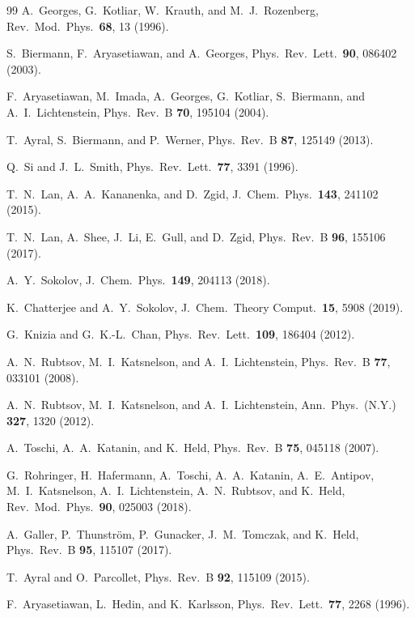 \documentclass[11pt,a4paper]{article}
\begin{document}
\begin{thebibliography}{99}
A.~Georges, G.~Kotliar, W.~Krauth, and M.~J.~Rozenberg,
Rev.~Mod.~Phys.\ \textbf{68}, 13 (1996).

S.~Biermann, F.~Aryasetiawan, and A.~Georges,
Phys.~Rev.~Lett.\ \textbf{90}, 086402 (2003).

F.~Aryasetiawan, M.~Imada, A.~Georges, G.~Kotliar, S.~Biermann, and A.~I.~Lichtenstein,
Phys.~Rev.~B \textbf{70}, 195104 (2004).

T.~Ayral, S.~Biermann, and P.~Werner, Phys.~Rev.~B \textbf{87}, 125149 (2013).

Q.~Si and J.~L.~Smith, Phys.~Rev.~Lett.\ \textbf{77}, 3391 (1996).

T.~N.~Lan, A.~A.~Kananenka, and D.~Zgid, J.~Chem.~Phys.\ \textbf{143}, 241102 (2015).

T.~N.~Lan, A.~Shee, J.~Li, E.~Gull, and D.~Zgid, Phys.~Rev.~B \textbf{96}, 155106 (2017).

A.~Y.~Sokolov, J.~Chem.~Phys.\ \textbf{149}, 204113 (2018).

K.~Chatterjee and A.~Y.~Sokolov, J.~Chem.~Theory Comput.\ \textbf{15}, 5908 (2019).

G.~Knizia and G.~K.-L.~Chan, Phys.~Rev.~Lett.\ \textbf{109}, 186404 (2012).

A.~N.~Rubtsov, M.~I.~Katsnelson, and A.~I.~Lichtenstein,
Phys.~Rev.~B \textbf{77}, 033101 (2008).

A.~N.~Rubtsov, M.~I.~Katsnelson, and A.~I.~Lichtenstein,
Ann.~Phys.\ (N.Y.) \textbf{327}, 1320 (2012).

A.~Toschi, A.~A.~Katanin, and K.~Held, Phys.~Rev.~B \textbf{75}, 045118 (2007).

G.~Rohringer, H.~Hafermann, A.~Toschi, A.~A.~Katanin, A.~E.~Antipov,
M.~I.~Katsnelson, A.~I.~Lichtenstein, A.~N.~Rubtsov, and K.~Held,
Rev.~Mod.~Phys.\ \textbf{90}, 025003 (2018).

A.~Galler, P.~Thunstr\"om, P.~Gunacker, J.~M.~Tomczak, and K.~Held,
Phys.~Rev.~B \textbf{95}, 115107 (2017).

T.~Ayral and O.~Parcollet, Phys.~Rev.~B \textbf{92}, 115109 (2015).

F.~Aryasetiawan, L.~Hedin, and K.~Karlsson, Phys.~Rev.~Lett.\ \textbf{77}, 2268 (1996).

\end{thebibliography}
\end{document}
